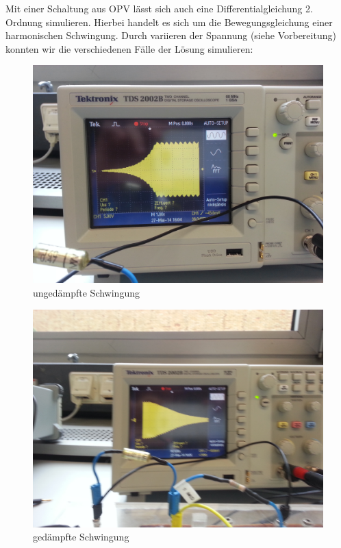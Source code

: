 \documentclass[a4paper,titlepage]{scrartcl}
\numberwithin{equation}{section}
\begin{document}
Mit einer Schaltung aus OPV lässt sich auch eine Differentialgleichung 2. Ordnung simulieren. Hierbei handelt es sich um die Bewegungsgleichung einer harmonischen Schwingung. Durch variieren der Spannung (siehe Vorbereitung) konnten wir die verschiedenen Fälle der Lösung simulieren:

\begin{figure}[H]
\centering
\includegraphics[scale=.08]{bilder/aufgabe_4_3_1.jpg} 
\caption{ungedämpfte Schwingung}
\end{figure}

\begin{figure}[H]
\centering
\includegraphics[scale=.08]{bilder/aufgabe_4_3_2.jpg} 
\caption{gedämpfte Schwingung}
\end{figure}
\end{document}
